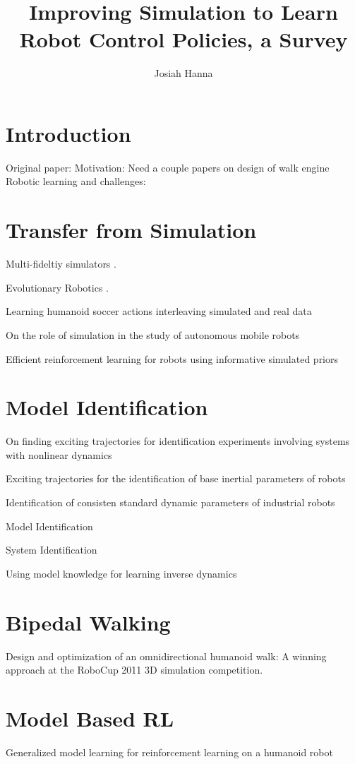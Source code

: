 \documentclass[12 pt]{article}
\author{Josiah Hanna}
\title{Improving Simulation to Learn Robot Control Policies, a Survey}
\begin{document}
\maketitle

\section{Introduction}

Original paper: \cite{farchy2013humanoid}
Motivation: Need a couple papers on design of walk engine
Robotic learning and challenges: \cite{kober2013reinforcement}


\section{Transfer from Simulation}
Multi-fideltiy simulators \cite{cutler2014reinforcement}.

Evolutionary Robotics \cite{koos2010crossing}.

Learning humanoid soccer actions interleaving simulated and real data

On the role of simulation in the study of autonomous mobile robots

Efficient reinforcement learning for robots using informative simulated priors

\section{Model Identification}

On finding exciting trajectories for identification experiments involving systems with nonlinear dynamics

Exciting trajectories for the identification of base inertial parameters of robots

Identification of consisten standard dynamic parameters of industrial robots

Model Identification

System Identification

Using model knowledge for learning inverse dynamics

\section{Bipedal Walking}

Design and optimization of an omnidirectional humanoid walk: A winning approach at the RoboCup 2011 3D simulation competition.

\section{Model Based RL}
Generalized model learning for reinforcement learning on a humanoid robot
\end{document}
